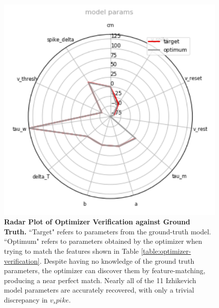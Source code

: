 \clearpage
\begin{figure}
    \centering
    \includegraphics[scale=0.75]{figures/radar_coordinates.png}
    \caption[Radar Plot of Optimizer Verification Against Ground Truth]{\textbf{Radar Plot of Optimizer Verification against Ground Truth.}
    ``Target" refers to parameters from the ground-truth model.
    ``Optimum" refers to parameters obtained by the optimizer when trying to match the features shown in Table \ref{table:optimizer-verification}.
    Despite having no knowledge of the ground truth parameters,
    the optimizer can discover them by feature-matching, producing a near perfect match.
    Nearly all of the 11 Izhikevich model parameters are accurately recovered, with only a trivial discrepancy in $v_spike$.
    }
    \label{fig:optimizer-verification-radar}
\end{figure}

